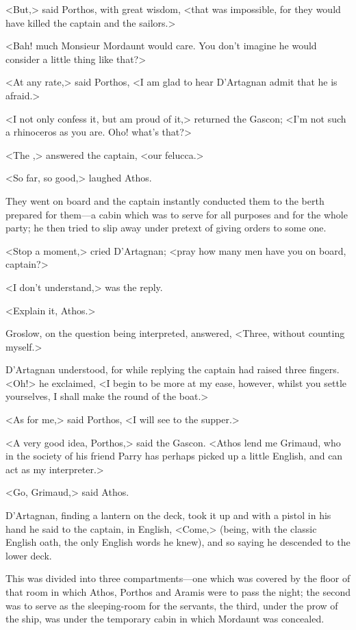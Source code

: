 <But,> said Porthos, with great wisdom, <that was impossible, for they would have killed the captain and the sailors.>

<Bah! much Monsieur Mordaunt would care. You don't imagine he would consider a little thing like that?>

<At any rate,> said Porthos, <I am glad to hear D'Artagnan admit that he is afraid.>

<I not only confess it, but am proud of it,> returned the Gascon; <I'm not such a rhinoceros as you are. Oho! what's that?>

<The ,> answered the captain, <our felucca.>

<So far, so good,> laughed Athos.

They went on board and the captain instantly conducted them to the berth prepared for them—a cabin which was to serve for all purposes and for the whole party; he then tried to slip away under pretext of giving orders to some one.

<Stop a moment,> cried D'Artagnan; <pray how many men have you on board, captain?>

<I don't understand,> was the reply.

<Explain it, Athos.>

Groslow, on the question being interpreted, answered, <Three, without counting myself.>

D'Artagnan understood, for while replying the captain had raised three fingers. <Oh!> he exclaimed, <I begin to be more at my ease, however, whilst you settle yourselves, I shall make the round of the boat.>

<As for me,> said Porthos, <I will see to the supper.>

<A very good idea, Porthos,> said the Gascon. <Athos lend me Grimaud, who in the society of his friend Parry has perhaps picked up a little English, and can act as my interpreter.>

<Go, Grimaud,> said Athos.

D'Artagnan, finding a lantern on the deck, took it up and with a pistol in his hand he said to the captain, in English, <Come,> (being, with the classic English oath, the only English words he knew), and so saying he descended to the lower deck.

This was divided into three compartments—one which was covered by the floor of that room in which Athos, Porthos and Aramis were to pass the night; the second was to serve as the sleeping-room for the servants, the third, under the prow of the ship, was under the temporary cabin in which Mordaunt was concealed.

